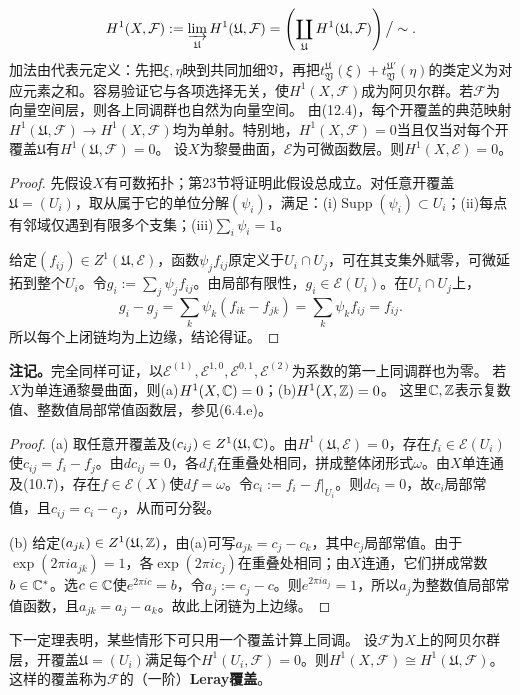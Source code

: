 \[
H^1(X,\mathcal F):=\varinjlim_{\mathfrak U}H^1(\mathfrak U,\mathcal F)
=\left(\coprod_{\mathfrak U}H^1(\mathfrak U,\mathcal F)\right)\big/\sim.
\]
加法由代表元定义：先把$\xi,\eta$映到共同加细$\mathfrak V$，再把$t_{\mathfrak V}^{\mathfrak U}(\xi)+t_{\mathfrak V}^{\mathfrak U'}(\eta)$的类定义为对应元素之和。容易验证它与各项选择无关，使$H^1(X,\mathcal F)$成为阿贝尔群。若$\mathcal F$为向量空间层，则各上同调群也自然为向量空间。
由(12.4)，每个开覆盖的典范映射$H^1(\mathfrak U,\mathcal F)\to H^1(X,\mathcal F)$均为单射。特别地，$H^1(X,\mathcal F)=0$当且仅当对每个开覆盖$\mathfrak U$有$H^1(\mathfrak U,\mathcal F)=0$。
设$X$为黎曼曲面，$\mathcal E$为可微函数层。则$H^1(X,\mathcal E)=0$。
\begin{proof}
先假设$X$有可数拓扑；第23节将证明此假设总成立。对任意开覆盖$\mathfrak U=(U_i)$，取从属于它的单位分解$(\psi_i)$，满足：(i)$\operatorname{Supp}(\psi_i)\subset U_i$；(ii)每点有邻域仅遇到有限多个支集；(iii)$\sum_i\psi_i=1$。

给定$(f_{ij})\in Z^1(\mathfrak U,\mathcal E)$，函数$\psi_jf_{ij}$原定义于$U_i\cap U_j$，可在其支集外赋零，可微延拓到整个$U_i$。令$g_i:=\sum_j\psi_jf_{ij}$。由局部有限性，$g_i\in\mathcal E(U_i)$。在$U_i\cap U_j$上，
\[
g_i-g_j=\sum_k\psi_k(f_{ik}-f_{jk})=\sum_k\psi_kf_{ij}=f_{ij}.
\]
所以每个上闭链均为上边缘，结论得证。
\end{proof}
\textbf{注记。}完全同样可证，以$\mathcal E^{(1)},\mathcal E^{1,0},\mathcal E^{0,1},\mathcal E^{(2)}$为系数的第一上同调群也为零。
若$X$为单连通黎曼曲面，则(a)$H^1(X,\mathbb C)=0$；(b)$H^1(X,\mathbb Z)=0$。
这里$\mathbb C,\mathbb Z$表示复数值、整数值局部常值函数层，参见(6.4.e)。
\begin{proof}
(a) 取任意开覆盖及$(c_{ij})\in Z^1(\mathfrak U,\mathbb C)$。由$H^1(\mathfrak U,\mathcal E)=0$，存在$f_i\in\mathcal E(U_i)$使$c_{ij}=f_i-f_j$。由$dc_{ij}=0$，各$df_i$在重叠处相同，拼成整体闭形式$\omega$。由$X$单连通及(10.7)，存在$f\in\mathcal E(X)$使$df=\omega$。令$c_i:=f_i-f|_{U_i}$。则$dc_i=0$，故$c_i$局部常值，且$c_{ij}=c_i-c_j$，从而可分裂。

(b) 给定$(a_{jk})\in Z^1(\mathfrak U,\mathbb Z)$，由(a)可写$a_{jk}=c_j-c_k$，其中$c_j$局部常值。由于$\exp(2\pi ia_{jk})=1$，各$\exp(2\pi ic_j)$在重叠处相同；由$X$连通，它们拼成常数$b\in\mathbb C^*$。选$c\in\mathbb C$使$e^{2\pi ic}=b$，令$a_j:=c_j-c$。则$e^{2\pi ia_j}=1$，所以$a_j$为整数值局部常值函数，且$a_{jk}=a_j-a_k$。故此上闭链为上边缘。
\end{proof}
下一定理表明，某些情形下可只用一个覆盖计算上同调。
设$\mathcal F$为$X$上的阿贝尔群层，开覆盖$\mathfrak U=(U_i)$满足每个$H^1(U_i,\mathcal F)=0$。则$H^1(X,\mathcal F)\cong H^1(\mathfrak U,\mathcal F)$。这样的覆盖称为$\mathcal F$的（一阶）\textbf{Leray覆盖}。
